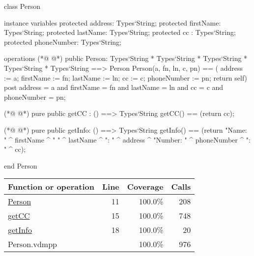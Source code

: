 \begin{vdmpp}[breaklines=true]
class Person

instance variables
  protected address: Types`String;
  protected firstName: Types`String;
  protected lastName: Types`String;
  protected cc : Types`String;
  protected phoneNumber: Types`String;
  
operations
(*@
\label{Person:11}
@*)
 public Person: Types`String * Types`String * Types`String * Types`String * Types`String ==> Person
  Person(a, fn, ln, c, pn) == ( address := a; firstName := fn; lastName := ln; cc := c; phoneNumber := pn; return self)
 post address = a and firstName = fn and lastName = ln and cc = c and phoneNumber = pn;
  
(*@
\label{getCC:15}
@*)
 pure public getCC : () ==> Types`String
  getCC() == (return cc);
  
(*@
\label{getInfo:18}
@*)
 pure public getInfo: () ==> Types`String
  getInfo() == (return "Name: " ^ firstName ^ " " ^ lastName ^ "\nAddress: " ^ address ^ "\nPhone Number: " ^ phoneNumber ^ "\nCC: " ^ cc);

end Person
\end{vdmpp}
\bigskip
\begin{longtable}{|l|r|r|r|}
\hline
Function or operation & Line & Coverage & Calls \\
\hline
\hline
\hyperref[Person:11]{Person} & 11&100.0\% & 208 \\
\hline
\hyperref[getCC:15]{getCC} & 15&100.0\% & 748 \\
\hline
\hyperref[getInfo:18]{getInfo} & 18&100.0\% & 20 \\
\hline
\hline
Person.vdmpp & & 100.0\% & 976 \\
\hline
\end{longtable}

